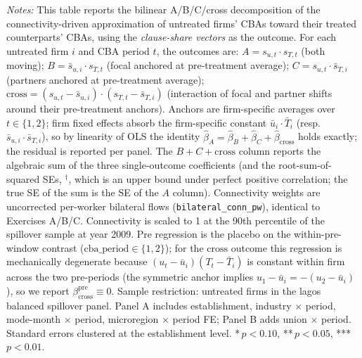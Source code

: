 \begin{table}[H]
\begin{minipage}{\linewidth}
\smallskip
\scriptsize\textit{Notes:} This table reports the bilinear A/B/C/cross decomposition of the connectivity-driven approximation of untreated firms' CBAs toward their treated counterparts' CBAs, using the \emph{clause-share vectors} as the outcome. For each untreated firm $i$ and CBA period $t$, the outcomes are: $A = s_{u,t} \cdot s_{T,t}$ (both moving); $B = \bar s_{u,i} \cdot s_{T,t}$ (focal anchored at pre-treatment average); $C = s_{u,t} \cdot \bar s_{T,i}$ (partners anchored at pre-treatment average); $\text{cross} = (s_{u,t} - \bar s_{u,i}) \cdot (s_{T,t} - \bar s_{T,i})$ (interaction of focal and partner shifts around their pre-treatment anchors). Anchors are firm-specific averages over $t \in \{1, 2\}$; firm fixed effects absorb the firm-specific constant $\bar u_i \cdot \bar T_i$ (resp.\ $\bar s_{u,i} \cdot \bar s_{T,i}$), so by linearity of OLS the identity $\hat\beta_A = \hat\beta_B + \hat\beta_C + \hat\beta_{\text{cross}}$ holds exactly; the residual is reported per panel. The $B{+}C{+}\text{cross}$ column reports the algebraic sum of the three single-outcome coefficients (and the root-sum-of-squared SEs, $^\dagger$, which is an upper bound under perfect positive correlation; the true SE of the sum is the SE of the $A$ column). Connectivity weights are uncorrected per-worker bilateral flows (\texttt{bilateral\_conn\_pw}), identical to Exercises A/B/C. Connectivity is scaled to 1 at the 90th percentile of the spillover sample at year 2009. Pre regression is the placebo on the within-pre-window contrast ($\text{cba\_period} \in \{1,2\}$); for the $\text{cross}$ outcome this regression is mechanically degenerate because $(u_t - \bar u_i)(T_t - \bar T_i)$ is constant within firm across the two pre-periods (the symmetric anchor implies $u_1 - \bar u_i = -(u_2 - \bar u_i)$), so we report $\beta_{\text{cross}}^{\text{pre}} \equiv 0$. Sample restriction: untreated firms in the lagos balanced spillover panel. Panel A includes establishment, industry $\times$ period, mode-month $\times$ period, microregion $\times$ period FE; Panel B adds union $\times$ period. Standard errors clustered at the establishment level. *\,$p<0.10$, **\,$p<0.05$, ***\,$p<0.01$.
\end{minipage}
\end{table}
